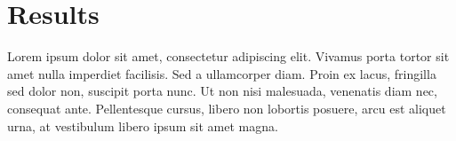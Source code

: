 \section*{Results}
\label{sec:results}

Lorem ipsum dolor sit amet, consectetur adipiscing elit. Vivamus porta tortor sit amet nulla imperdiet facilisis. Sed a ullamcorper diam. Proin ex lacus, fringilla sed dolor non, suscipit porta nunc. Ut non nisi malesuada, venenatis diam nec, consequat ante. Pellentesque cursus, libero non lobortis posuere, arcu est aliquet urna, at vestibulum libero ipsum sit amet magna.